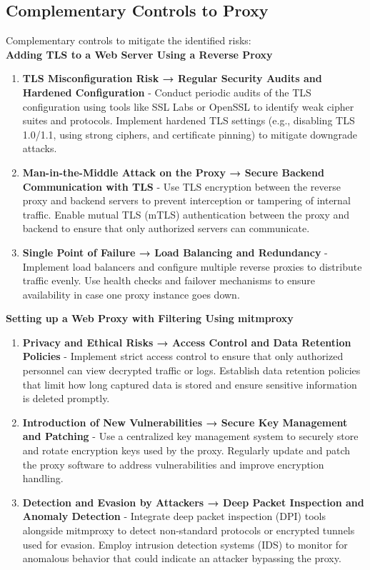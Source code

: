 \documentclass[12pt,a4paper]{report}
\begin{document}
\subsection{Complementary Controls to Proxy}
Complementary controls to mitigate the identified risks: \\

\textbf{Adding TLS to a Web Server Using a Reverse Proxy}
\begin{enumerate}
	\item \textbf{TLS Misconfiguration Risk → Regular Security Audits and Hardened Configuration} - Conduct periodic audits of the TLS configuration using tools like SSL Labs or OpenSSL to identify weak cipher suites and protocols. Implement hardened TLS settings (e.g., disabling TLS 1.0/1.1, using strong ciphers, and certificate pinning) to mitigate downgrade attacks.
	
	\item \textbf{Man-in-the-Middle Attack on the Proxy → Secure Backend Communication with TLS} - Use TLS encryption between the reverse proxy and backend servers to prevent interception or tampering of internal traffic. Enable mutual TLS (mTLS) authentication between the proxy and backend to ensure that only authorized servers can communicate.
	
	\item \textbf{Single Point of Failure → Load Balancing and Redundancy} - Implement load balancers and configure multiple reverse proxies to distribute traffic evenly. Use health checks and failover mechanisms to ensure availability in case one proxy instance goes down.
\end{enumerate}


\textbf{Setting up a Web Proxy with Filtering Using mitmproxy}
\begin{enumerate}
	\item \textbf{Privacy and Ethical Risks → Access Control and Data Retention Policies} - Implement strict access control to ensure that only authorized personnel can view decrypted traffic or logs. Establish data retention policies that limit how long captured data is stored and ensure sensitive information is deleted promptly.
	
	\item \textbf{Introduction of New Vulnerabilities → Secure Key Management and Patching} - Use a centralized key management system to securely store and rotate encryption keys used by the proxy. Regularly update and patch the proxy software to address vulnerabilities and improve encryption handling.
	
	\item \textbf{Detection and Evasion by Attackers → Deep Packet Inspection and Anomaly Detection} - Integrate deep packet inspection (DPI) tools alongside mitmproxy to detect non-standard protocols or encrypted tunnels used for evasion. Employ intrusion detection systems (IDS) to monitor for anomalous behavior that could indicate an attacker bypassing the proxy.
\end{enumerate}
\end{document}
